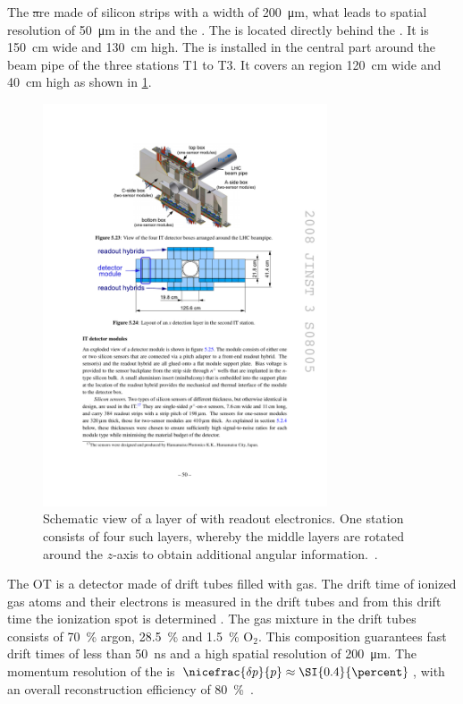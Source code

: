 The \st are made of silicon strips with a width of \SI{200}{\micro\metre}, what leads to spatial resolution of \SI{50}{\micro\metre} in the \intr and the \ttracker.
The \ttracker is located directly behind the \richone.
It is \SI{150}{\centi\metre} wide and \SI{130}{\centi\metre} high.
The \intr is installed in the central part around the beam pipe of the three stations T1 to T3.
It covers an region \SI{120}{\centi\metre} wide and \SI{40}{\centi\metre} high as shown in \cref{fig:InnerTracker}.
\begin{figure}[tbp]
    \centering
    \includegraphics[width=0.75\textwidth]{05lhcb/figs/IT.pdf}
    \caption{Schematic view of a layer of \intr with readout electronics.
    One station consists of four such layers, whereby the middle layers are rotated around the $z$-axis to obtain additional angular information.~\cite{Alves:2008zz}.}
    \label{fig:InnerTracker}
\end{figure}

The OT is a detector made of drift tubes filled with gas.
The drift time of ionized gas atoms and their electrons is measured in the drift tubes and from this drift time the ionization spot is determined .
The gas mixture in the drift tubes consists of \SI{70}{\percent} argon, \SI{28.5}{\percent} \cotwo and \SI{1.5}{\percent} $\mathrm O_2$.
This composition guarantees fast drift times of less than \SI{50}{\nano\second} and a high spatial resolution of \SI{200}{\micro\metre}.
The momentum resolution of the \ot is $\nicefrac{\delta p}{p}\approx\SI{0.4}{\percent}$, with an overall reconstruction efficiency of \SI{80}{\percent}~\cite{Alves:2008zz}.

